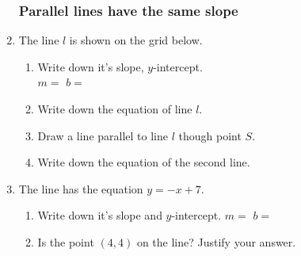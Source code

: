 \begin{enumerate}
\subsubsection*{Parallel lines have the same slope}
\item The line $l$ is shown on the grid below.
\begin{multicols}{2}
\begin{enumerate}
  \item Write down it's slope, $y$-intercept.\\ $m=$
  \hspace{2cm} $b=$
  \vspace{0.25cm}
  \item Write down the equation of line $l$.
  \vspace{1cm}
  \item Draw a line parallel to line $l$ though point $S$.
  \item Write down the equation of the second line.
\end{enumerate}
  \begin{center}
  \end{center}
\end{multicols}\vspace{0.5cm}

\item The line has the equation $y=-x+7$. 
\begin{enumerate}
  \item Write down it's slope and $y$-intercept. \hspace{2cm} $m=$
  \hspace{2cm} $b=$
  \item Is the point $(4, 4)$ on the line? Justify your answer.
\end{enumerate}
\vspace{2cm}


\end{enumerate}
